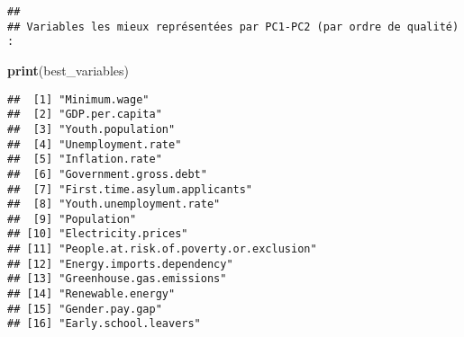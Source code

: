\documentclass[
]{article}
\newenvironment{Shaded}{\begin{snugshade}}{\end{snugshade}}
\newcommand{\CommentTok}[1]{\textcolor[rgb]{0.56,0.35,0.01}{\textit{#1}}}
\newcommand{\DecValTok}[1]{\textcolor[rgb]{0.00,0.00,0.81}{#1}}
\newcommand{\FunctionTok}[1]{\textcolor[rgb]{0.13,0.29,0.53}{\textbf{#1}}}
\newcommand{\NormalTok}[1]{#1}
\newcommand{\OtherTok}[1]{\textcolor[rgb]{0.56,0.35,0.01}{#1}}
\newcommand{\SpecialCharTok}[1]{\textcolor[rgb]{0.81,0.36,0.00}{\textbf{#1}}}
\newcommand{\StringTok}[1]{\textcolor[rgb]{0.31,0.60,0.02}{#1}}
\begin{document}
\begin{verbatim}
## 
## Variables les mieux représentées par PC1-PC2 (par ordre de qualité) :
\end{verbatim}

\begin{Shaded}
\begin{Highlighting}[]
\FunctionTok{print}\NormalTok{(best\_variables)}
\end{Highlighting}
\end{Shaded}

\begin{verbatim}
##  [1] "Minimum.wage"                          
##  [2] "GDP.per.capita"                        
##  [3] "Youth.population"                      
##  [4] "Unemployment.rate"                     
##  [5] "Inflation.rate"                        
##  [6] "Government.gross.debt"                 
##  [7] "First.time.asylum.applicants"          
##  [8] "Youth.unemployment.rate"               
##  [9] "Population"                            
## [10] "Electricity.prices"                    
## [11] "People.at.risk.of.poverty.or.exclusion"
## [12] "Energy.imports.dependency"             
## [13] "Greenhouse.gas.emissions"              
## [14] "Renewable.energy"                      
## [15] "Gender.pay.gap"                        
## [16] "Early.school.leavers"
\end{verbatim}

\begin{Shaded}
\end{Shaded}
\end{document}
